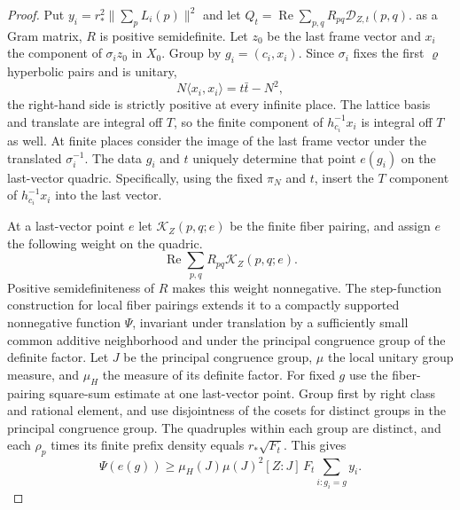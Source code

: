 \begin{proof}
Put $y_i=r_*^2\|\sum_p L_i(p)\|^2$ and let
$Q_t=\operatorname{Re}\sum_{p,q}R_{pq}\mathcal D_{Z,t}(p,q)$.
as a Gram matrix, $R$ is positive semidefinite.
Let $z_0$ be the last frame vector and $x_i$ the component of $\sigma_i z_0$ in $X_0$.
Group by $g_i=(c_i,x_i)$. Since $\sigma_i$ fixes the first $\varrho$ hyperbolic pairs and is unitary,
\[
 N\langle x_i,x_i\rangle=t\bar t-N^2 ,
\]
the right-hand side is strictly positive at every infinite place.
The lattice basis and translate are integral off $T$,
so the finite component of $h_{c_i}^{-1}x_i$ is integral off $T$ as well.
At finite places consider the image of the last frame vector under the translated $\sigma_i^{-1}$.
The data $g_i$ and $t$ uniquely determine that point $e(g_i)$ on the last-vector quadric.
Specifically, using the fixed $\pi_N$ and $t$, insert
the $T$ component of $h_{c_i}^{-1}x_i$ into the last vector.

At a last-vector point $e$ let $\mathcal K_Z(p,q;e)$ be the finite fiber pairing,
and assign $e$ the following weight on the quadric.
\[
 \operatorname{Re}\sum_{p,q}R_{pq}\mathcal K_Z(p,q;e).
\]
Positive semidefiniteness of $R$ makes this weight nonnegative. The step-function construction for local fiber pairings extends it to
a compactly supported nonnegative function $\Psi$, invariant under translation by a sufficiently small common additive neighborhood
and under the principal congruence group of the definite factor.
Let $J$ be the principal congruence group, $\mu$ the local unitary group measure, and $\mu_H$ the measure of its definite factor.
For fixed $g$ use the fiber-pairing square-sum estimate at one last-vector point.
Group first by right class and rational element, and use disjointness of the cosets for distinct groups in the principal congruence group.
The quadruples within each group are distinct, and each $\rho_p$ times its finite prefix density equals $r_*\sqrt{F_t}$. This gives
\[
 \Psi(e(g))\ge
   \mu_H(J)\mu(J)^2[Z:J]\,F_t\!\sum_{i:g_i=g} y_i.
\]


\end{proof}
